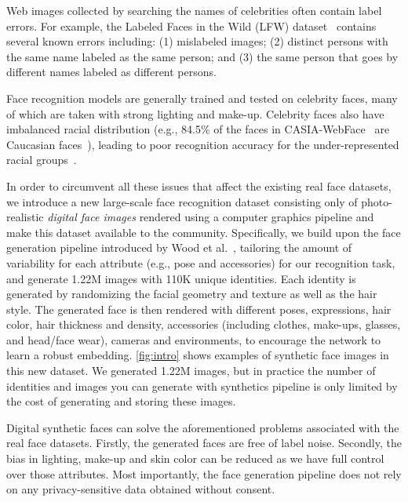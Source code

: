 \documentclass[10pt,twocolumn,letterpaper]{article}
\begin{document}
 Web images collected by searching the names of celebrities often contain label errors. For example, the Labeled Faces in the Wild (LFW) dataset~\cite{2008_FRD_LFW} contains several known errors including: (1) mislabeled images; (2) distinct persons with the same name labeled as the same person; and (3) the same person that goes by different names labeled as different persons. 

Face recognition models are generally trained and tested on celebrity faces, many of which are taken with strong lighting and make-up. Celebrity faces also have imbalanced racial distribution (e.g., 84.5\% of the faces in CASIA-WebFace~\cite{2014_FRD_casiawebface} are Caucasian faces~\cite{2019_FRD_RFW}), leading to poor recognition accuracy for the under-represented racial groups~\cite{2019_FRD_RFW}.

In order to circumvent all these issues that affect the existing real face datasets, we introduce a new large-scale face recognition dataset consisting only of photo-realistic \textit{digital face images} rendered using a computer graphics pipeline and make this dataset available to the community. Specifically, we build upon the face generation pipeline introduced by Wood et al.~\cite{2021_FakeItMakeIt}, tailoring the amount of variability for each attribute (e.g., pose and accessories) for our recognition task, and generate 1.22M images with 110K unique identities. Each identity is generated by randomizing the facial geometry and texture as well as the hair style. The generated face is then rendered with different poses, expressions, hair color, hair thickness and density, accessories (including clothes, make-ups, glasses, and head/face wear), cameras and environments, to encourage the network to learn a robust embedding. \autoref{fig:intro} shows examples of synthetic face images in this new dataset. We generated 1.22M images, but in practice the number of identities and images you can generate with synthetics pipeline is only limited by the cost of generating and storing these images.

Digital synthetic faces can solve the aforementioned problems associated with the real face datasets. Firstly, the generated faces are free of label noise. Secondly, the bias in lighting, make-up and skin color can be reduced as we have full control over those attributes. Most importantly, the face generation pipeline does not rely on any privacy-sensitive data obtained without consent.
\end{document}
